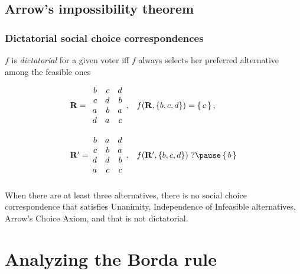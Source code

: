 \documentclass[french,english]{beamer}
\begin{document}
\subsection[Arrow]{Arrow’s impossibility theorem}
\begin{frame}
	\frametitle{Dictatorial social choice correspondences}
	\begin{definition}
		$f$ is \emph{dictatorial} for a given voter iff $f$ always selects her preferred alternative among the feasible ones
	\end{definition}
	\vspace{-1.8pt}
	\begin{example}
		\begin{equation}
			\begin{array}{l@{\hskip 0in}ll}
				\prof =
				&\begin{array}{rrr}
					b	&	c	&	d\\
					c	&	d	&	b\\
					a	&	b	&	a\\
					d	&	a	&	c
				\end{array},
				& f(\prof, \{b, c, d\}) = \set{c},\\[3em]
				\prof' =
				&\begin{array}{rrr}
					b	&	a	&	d\\
					c	&	b	&	a\\
					d	&	d	&	b\\
					a	&	c	&	c
				\end{array},
				& f(\prof', \{b, c, d\})\text{ ?}
				\pause
				\set{b}
			\end{array}
		\end{equation}
	\end{example}
\end{frame}

\begin{frame}
	\frametitle{\subsecname}
	\begin{theorem}[\subsecname]
		When there are at least three alternatives, there is no social choice correspondence that satisfies Unanimity, Independence of Infeasible alternatives, Arrow’s Choice Axiom, and that is not dictatorial.
	\end{theorem}
\end{frame}

\section{Analyzing the Borda rule}
\end{document}
